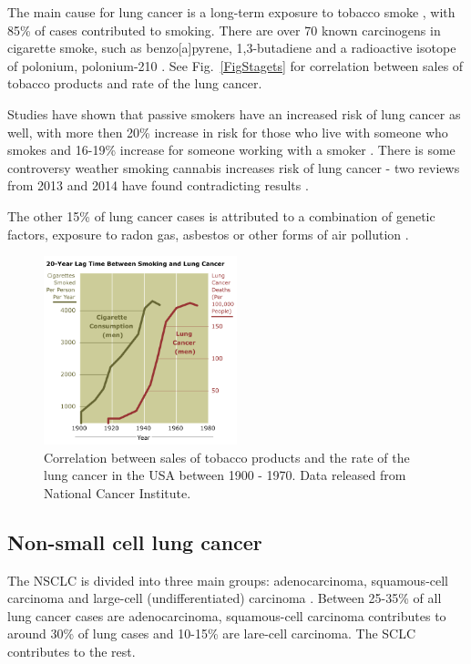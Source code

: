 \documentclass[type=dr, dr=rernat, accentcolor=tud7b,colorbacktitle, bigchapter, openright, twoside, 12pt ]{tudthesis}
\begin{document}
The main cause for lung cancer is a long-term exposure to tobacco smoke \cite{Tsao2008}, with 85\% of cases contributed to smoking. There are over 70 known carcinogens in cigarette smoke, such as benzo[a]pyrene, 1,3-butadiene and a radioactive isotope of polonium, polonium-210 \cite{Hecht2012}. See Fig.~\ref{FigStagets} for correlation between sales of tobacco products and rate of the lung cancer.

Studies have shown that passive smokers have an increased risk of lung cancer as well, with more then 20\% increase in risk for those who live with someone who smokes and 16-19\% increase for someone working with a smoker \cite{Taylor2007}.
There is some controversy weather smoking cannabis increases risk of lung cancer - two reviews from 2013 and 2014 have found contradicting results \cite{Tasckin2013, Underner2014}.

The other 15\% of lung cancer cases is attributed to a combination of genetic factors, exposure to radon gas, asbestos or other forms of air pollution \cite{Alberg2010}.

\begin{figure}[H]
	\begin{center}
		\includegraphics[width=0.5\textwidth]{./Images/Smoking.png}
		\caption{Correlation between sales of tobacco products and the rate of the lung cancer in the USA between 1900 - 1970. Data released from National Cancer Institute.}
		\label{Fig:Stages}
	\end{center}
\end{figure}


\subsection{Non-small cell lung cancer}

The NSCLC is divided into three main groups: adenocarcinoma, squamous-cell carcinoma and large-cell (undifferentiated) carcinoma \cite{Kasper2015}.
Between 25-35\% of all lung cancer cases are adenocarcinoma, squamous-cell carcinoma contributes to around 30\% of lung cases and 10-15\% are lare-cell carcinoma. The SCLC contributes to the rest. 
\end{document}
